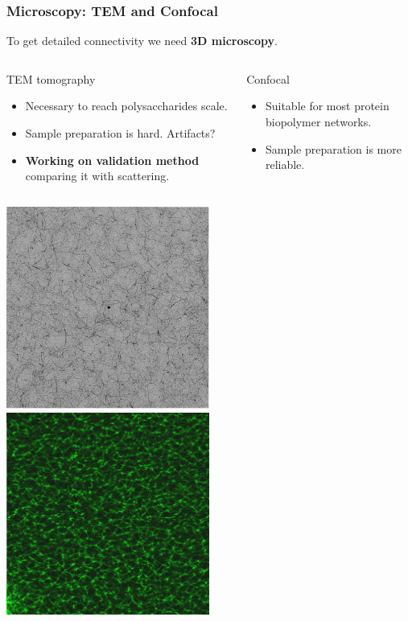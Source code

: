 \documentclass[9pt]{beamer}
\begin{document}
\begin{frame}
  \frametitle{Microscopy: TEM and Confocal}
  To get detailed connectivity we need \textbf{3D microscopy}.
  \begin{columns}[T,onlytextwidth]
      \begin{exampleblock}{TEM tomography}
          \begin{itemize}
              \item Necessary to reach polysaccharides scale.
              \item Sample preparation is hard. Artifacts?
              \item \textbf{Working on validation method} comparing it with scattering.
          \end{itemize}
      \end{exampleblock}
      \begin{exampleblock}{Confocal}
          \begin{itemize}
              \item Suitable for most protein biopolymer networks.
              \item Sample preparation is more reliable.
          \end{itemize}
      \end{exampleblock}
  \end{columns}
  \begin{columns}[T,onlytextwidth]
      \centering\includegraphics[width=0.5\textwidth]{./Figures/image_tem.png}
      \centering\includegraphics[width=0.5\textwidth]{./Figures/image_confocal.png}
  \end{columns}
\end{frame}
\end{document}
